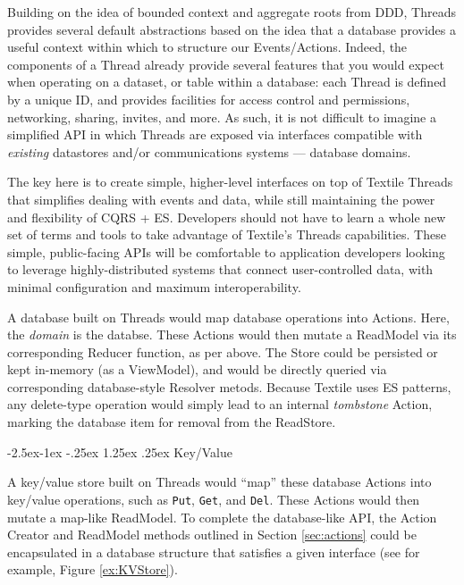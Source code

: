 \documentclass{textile}
\makeatletter
\renewcommand\paragraph{\@startsection{paragraph}{4}{\z@}%
            {-2.5ex\@plus -1ex \@minus -.25ex}%
            {1.25ex \@plus .25ex}%
            {\normalfont\normalsize\itshape}}
\makeatother
\begin{document}
Building on the idea of bounded context and aggregate roots from DDD, Threads provides several default abstractions based on the idea that a database provides a useful context within which to structure our Events/Actions. Indeed, the components of a Thread already provide several features that you would expect when operating on a dataset, or table within a database: each Thread is defined by a unique ID, and provides facilities for access control and permissions, networking, sharing, invites, and more. As such, it is not difficult to imagine a simplified API in which Threads are exposed via interfaces compatible with \emph{existing} datastores and/or communications systems --- database domains.

The key here is to create simple, higher-level interfaces on top of Textile Threads that simplifies dealing with events and data, while still maintaining the power and flexibility of CQRS + ES. Developers should not have to learn a whole new set of terms and tools to take advantage of Textile's Threads capabilities. These simple, public-facing APIs will be comfortable to application developers looking to leverage highly-distributed systems that connect user-controlled data, with minimal configuration and maximum interoperability.

A database built on Threads would map database operations into Actions. Here, the \emph{domain} is the databse. These Actions would then mutate a ReadModel via its corresponding Reducer function, as per above. The Store could be persisted or kept in-memory (as a ViewModel), and would be directly queried via corresponding database-style Resolver metods. Because Textile uses ES patterns, any delete-type operation would simply lead to an internal \emph{tombstone} Action, marking the database item for removal from the ReadStore.

\paragraph{Key/Value}

A key/value store built on Threads would ``map'' these database Actions into key/value operations, such as \texttt{Put}, \texttt{Get}, and \texttt{Del}. These Actions would then mutate a map-like ReadModel. To complete the database-like API, the Action Creator and ReadModel methods outlined in Section \ref{sec:actions} could be encapsulated in a database structure that satisfies a given interface (see for example, Figure \ref{ex:KVStore}).
\end{document}
